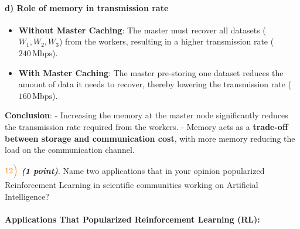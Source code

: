 \documentclass[11pt]{article}
\providecommand{\tightlist}{%
      \setlength{\itemsep}{0pt}\setlength{\parskip}{0pt}}
\begin{document}
\paragraph{\texorpdfstring{\textbf{d) Role of memory in transmission
rate}}{d) Role of memory in transmission rate}}\label{d-role-of-memory-in-transmission-rate}

\begin{itemize}
\tightlist
\item
  \textbf{Without Master Caching}: The master must recover all datasets
  (\(W_1, W_2, W_3\)) from the workers, resulting in a higher
  transmission rate (\(240 \, \text{Mbps}\)).
\item
  \textbf{With Master Caching}: The master pre-storing one dataset
  reduces the amount of data it needs to recover, thereby lowering the
  transmission rate (\(160 \, \text{Mbps}\)).
\end{itemize}

\textbf{Conclusion}: - Increasing the memory at the master node
significantly reduces the transmission rate required from the workers. -
Memory acts as a \textbf{trade-off between storage and communication
cost}, with more memory reducing the load on the communication channel.

    \(\color{orange}12\Bigl)\) \textbf{\emph{(1 point)}}. Name two
applications that in your opinion popularized Reinforcement Learning in
scientific communities working on Artificial Intelligence?

    \paragraph{\texorpdfstring{\textbf{Applications That Popularized
Reinforcement Learning
(RL):}}{Applications That Popularized Reinforcement Learning (RL):}}\label{applications-that-popularized-reinforcement-learning-rl}
\end{document}
